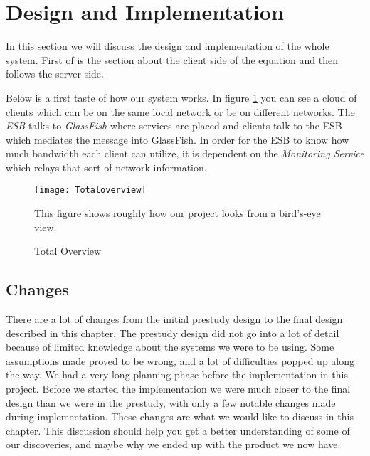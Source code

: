 \section{Design and Implementation}\label{Design and Implementation}
	In this section we will discuss the design and implementation of the whole system. First of is the section about the client side of the equation and then follows the server side. 
	
	Below is a first taste of how our system works. In figure \ref{fig:totaloverview} you can see a cloud of clients which can be on the same local network or be on different networks. The \textit{ESB} talks to \textit{GlassFish} where services are placed and clients talk to the ESB which mediates the message into GlassFish. In order for the ESB to know how much bandwidth each client can utilize, it is dependent on the \textit{Monitoring Service} which relays that sort of network information.
    
    \begin{figure}[H]
        \centering
        \texttt{[image: Totaloverview]}
        \caption{Total Overview}
        This figure shows roughly how our project looks from a bird's-eye view.
        \label{fig:totaloverview}
    \end{figure}

    
    
    
    \subsection{Changes}\label{Changes}
        There are a lot of changes from the initial prestudy design to the final design described in this chapter. The prestudy design did not go into a lot of detail because of limited knowledge about the systems we were to be using. Some assumptions made proved to be wrong, and a lot of difficulties popped up along the way. We had a very long planning phase before the implementation in this project. Before we started the implementation we were much closer to the final design than we were in the prestudy, with only a few notable changes made during implementation. These changes are what we would like to discuss in this chapter. This discussion should help you get a better understanding of some of our discoveries, and maybe why we ended up with the product we now have.
     

   
   
